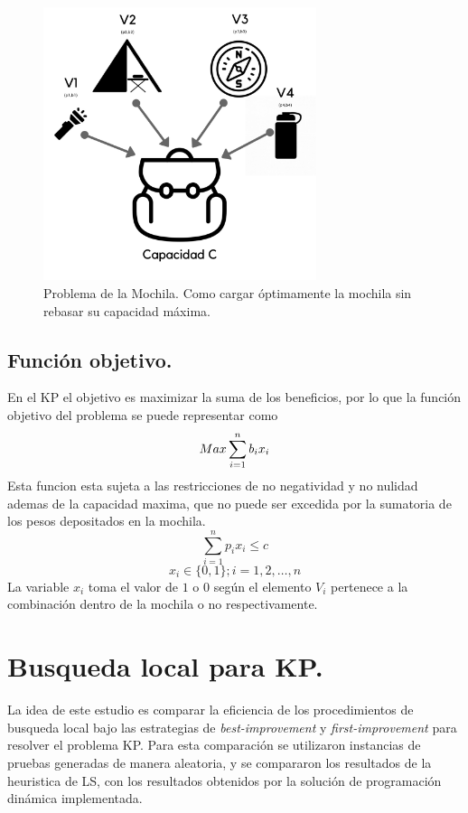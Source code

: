\documentclass{ci5652}
\begin{document}
 	\begin{figure}[h]
 	\caption{Problema de la Mochila. Como cargar óptimamente la mochila sin rebasar su capacidad máxima.}
	\includegraphics[width=8cm, height=8cm]{KP.png}
	\end{figure}
	\subsection{Función objetivo.}
	En el KP el objetivo es maximizar la suma de los beneficios, por lo que la función objetivo del problema se puede representar como
	$$
		Max \sum_{i=1}^{n} b_i x_i \\
	$$
	Esta funcion esta sujeta a las restricciones de no negatividad y no nulidad ademas de la capacidad maxima, que no puede ser excedida por la sumatoria de los pesos depositados en la mochila.
	$$
		\sum_{i=1}^{n} p_i x_i \leq c
	$$
	$$
	x_i \in \{0,1\};i=1,2,\ldots,n
	$$
	La variable $x_i$ toma el valor de $1$ o $0$ según el elemento $V_i$ pertenece a la combinación dentro de la mochila o no respectivamente.

	\section{Busqueda local para KP.}
	La idea de este estudio es comparar la eficiencia de los procedimientos de busqueda local bajo las estrategias de \textit{best-improvement} y \textit{first-improvement} para resolver el problema KP. Para esta comparación se utilizaron instancias de pruebas generadas de manera aleatoria, y se compararon los resultados de la heuristica de LS, con los resultados obtenidos por la solución de programación dinámica implementada.\\
\end{document}
